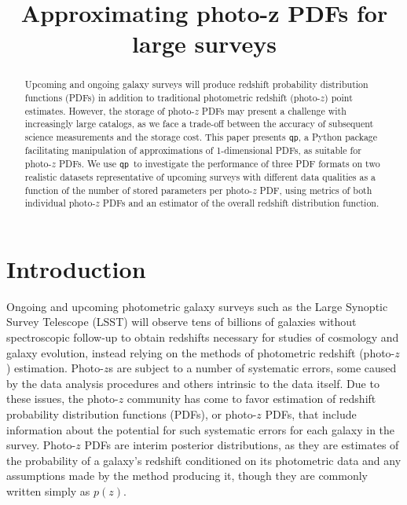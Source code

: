 \documentclass[\docopts]{\docclass}
\newcommand{\qp}{\texttt{qp}}
\newcommand{\pz}{photo-$z$ PDF}
\newcommand{\Pz}{Photo-$z$ PDF}
\begin{document}
\title{ Approximating photo-z PDFs for large surveys }


\begin{abstract}

Upcoming and ongoing galaxy surveys will produce redshift probability 
distribution functions (PDFs) in addition to traditional photometric redshift 
(photo-$z$) point estimates.  However, the storage of \pz s may present a 
challenge with increasingly large catalogs, as we face a trade-off between the 
accuracy of subsequent science measurements and the storage cost.  This paper 
presents \qp, a Python package facilitating manipulation of approximations of 
1-dimensional PDFs, as suitable for \pz s.  We use \qp\ to investigate the 
performance of three PDF formats on two realistic datasets representative of 
upcoming surveys with different data qualities as a function of the number of 
stored parameters per \pz, using metrics of both individual \pz s and an 
estimator of the overall redshift distribution function.

\end{abstract}


\maketitlepost





\section{Introduction}
\label{sec:intro}


Ongoing and upcoming photometric galaxy surveys such as the Large Synoptic 
Survey Telescope (LSST) will observe tens of billions of galaxies without 
spectroscopic follow-up to obtain redshifts necessary for studies of cosmology 
and galaxy evolution, instead relying on the methods of photometric redshift 
(photo-$z$) estimation.  Photo-$z$s are subject to a number of systematic 
errors, some caused by the data analysis procedures and others intrinsic to the 
data itself.  Due to these issues, the photo-$z$ community has come to favor 
estimation of redshift probability distribution functions (PDFs), or \pz s, 
that include information about the potential for such systematic errors for 
each galaxy in the survey.  \Pz s are interim posterior distributions, as they 
are estimates of the probability of a galaxy's redshift conditioned on its 
photometric data and any assumptions made by the method producing it, though 
they are commonly written simply as $p(z)$.
\end{document}
